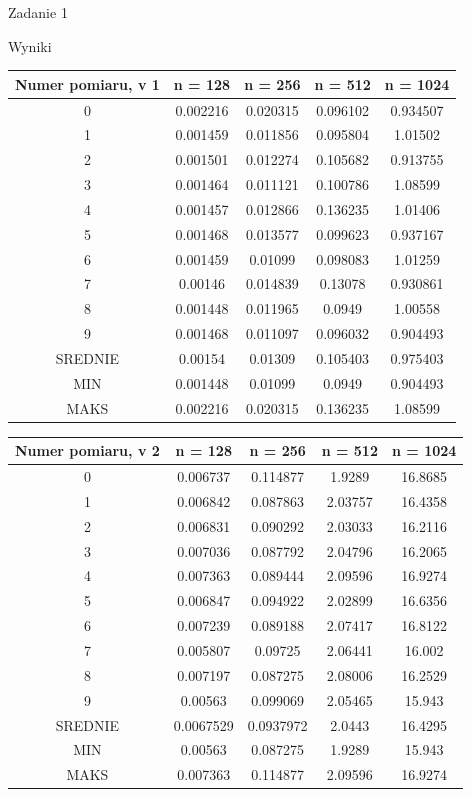 \documentclass[11pt,wide]{mwart}
\begin{document}
\begin{section}{Zadanie 1}
\begin{subsection}{Wyniki}
   \begin{center}
\begin{tabular}{|c|c|c|c|c|}
\hline
Numer pomiaru, v 1 & n = 128 & n = 256 & n = 512 & n = 1024\\
\hline
0 & 0.002216 & 0.020315 & 0.096102 & 0.934507\\
\hline
1 & 0.001459 & 0.011856 & 0.095804 & 1.01502\\
\hline
2 & 0.001501 & 0.012274 & 0.105682 & 0.913755\\
\hline
3 & 0.001464 & 0.011121 & 0.100786 & 1.08599\\
\hline
4 & 0.001457 & 0.012866 & 0.136235 & 1.01406\\
\hline
5 & 0.001468 & 0.013577 & 0.099623 & 0.937167\\
\hline
6 & 0.001459 & 0.01099 & 0.098083 & 1.01259\\
\hline
7 & 0.00146 & 0.014839 & 0.13078 & 0.930861\\
\hline
8 & 0.001448 & 0.011965 & 0.0949 & 1.00558\\
\hline
9 & 0.001468 & 0.011097 & 0.096032 & 0.904493\\
\hline
SREDNIE & 0.00154 & 0.01309 & 0.105403 & 0.975403\\
\hline
MIN & 0.001448 & 0.01099 & 0.0949 & 0.904493\\
\hline
MAKS & 0.002216 & 0.020315 & 0.136235 & 1.08599\\
\hline
\end{tabular}
\end{center}

\begin{center}
\begin{tabular}{|c|c|c|c|c|}
\hline
Numer pomiaru, v 2 & n = 128 & n = 256 & n = 512 & n = 1024\\
\hline
0 & 0.006737 & 0.114877 & 1.9289 & 16.8685\\
\hline
1 & 0.006842 & 0.087863 & 2.03757 & 16.4358\\
\hline
2 & 0.006831 & 0.090292 & 2.03033 & 16.2116\\
\hline
3 & 0.007036 & 0.087792 & 2.04796 & 16.2065\\
\hline
4 & 0.007363 & 0.089444 & 2.09596 & 16.9274\\
\hline
5 & 0.006847 & 0.094922 & 2.02899 & 16.6356\\
\hline
6 & 0.007239 & 0.089188 & 2.07417 & 16.8122\\
\hline
7 & 0.005807 & 0.09725 & 2.06441 & 16.002\\
\hline
8 & 0.007197 & 0.087275 & 2.08006 & 16.2529\\
\hline
9 & 0.00563 & 0.099069 & 2.05465 & 15.943\\
\hline
SREDNIE & 0.0067529 & 0.0937972 & 2.0443 & 16.4295\\
\hline
MIN & 0.00563 & 0.087275 & 1.9289 & 15.943\\
\hline
MAKS & 0.007363 & 0.114877 & 2.09596 & 16.9274\\
\hline
\end{tabular}
\end{center}


\end{subsection}
\end{section}
\end{document}
